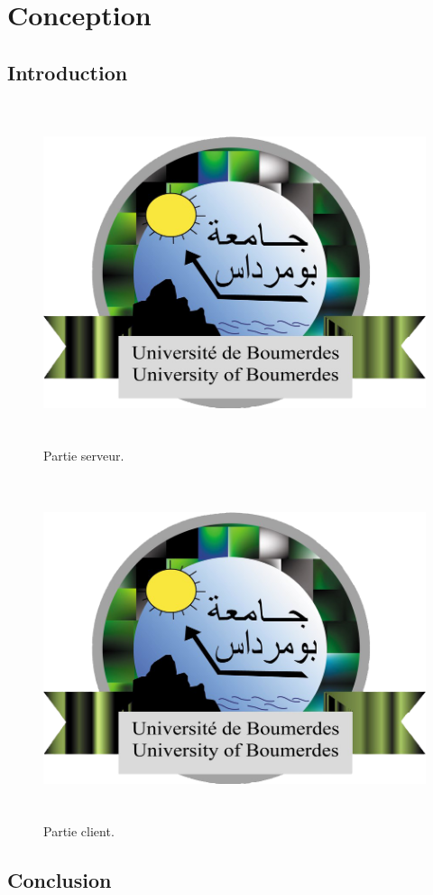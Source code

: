 \chapter{Conception}

\newpage

\section{Introduction}

\begin{figure}[hbt!]
  \centering
  \includegraphics[height=10cm]{images_pfe/Logo_umbb.png}
  \caption{Partie serveur.}
  \label{fig:server-side}
\end{figure}
\FloatBarrier

\medskip




\begin{figure}[hbt!]
  \centering
  \includegraphics[height=10cm]{images_pfe/Logo_umbb.png}
  \caption{Partie client.}
  \label{fig:client-side}
\end{figure}
\FloatBarrier



\section{Conclusion}


